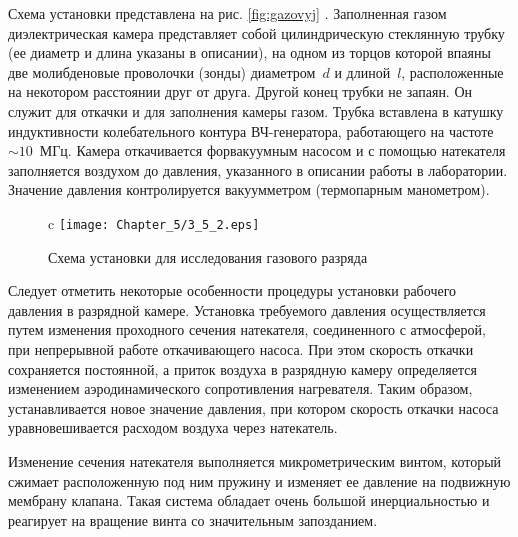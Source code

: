 \experiment
Схема установки представлена на рис. \ref{fig:gazovyj} %
. Заполненная газом диэлектрическая камера представляет собой цилиндрическую
стеклянную трубку (ее диаметр и длина указаны в описании), на одном из торцов которой впаяны две молибденовые проволочки (зонды)
диаметром~$d$ и длиной~$l$, расположенные на некотором расстоянии друг от друга. Другой конец трубки не запаян.
Он служит для откачки и для заполнения камеры газом. Трубка вставлена в катушку индуктивности колебательного контура
ВЧ-генератора, работающего на частоте~$\sim10$~МГц. Камера откачивается форвакуумным насосом и с помощью натекателя
заполняется воздухом до давления, указанного в описании работы в лаборатории. Значение давления контролируется вакуумметром
(термопарным манометром).


\begin{figure}{c}
	\texttt{[image: Chapter\_5/3\_5\_2.eps]}
	\caption{Схема установки для исследования газового разряда}
	\figmark[gazovyj]
\end{figure}


Следует отметить некоторые особенности процедуры установки рабочего давления в разрядной камере. Установка требуемого давления осуществляется путем изменения проходного сечения натекателя, соединенного с атмосферой, при непрерывной работе откачивающего насоса. При этом скорость откачки сохраняется постоянной, а приток воздуха в разрядную камеру определяется изменением аэродинамического сопротивления нагревателя. Таким образом, устанавливается новое значение давления, при котором скорость откачки насоса уравновешивается расходом воздуха через натекатель.

Изменение сечения натекателя выполняется микрометрическим винтом, который сжимает расположенную под ним пружину и изменяет ее давление на подвижную мембрану клапана. Такая система обладает очень большой инерциальностью и реагирует на вращение винта со значительным запозданием.
 
